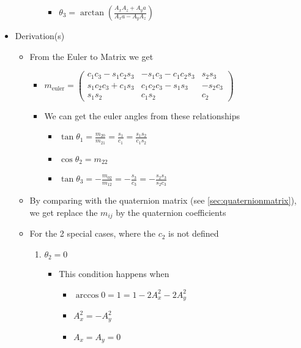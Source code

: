 \documentclass[letterpaper]{article}
\begin{document}
\begin{itemize}
\begin{itemize}
\begin{enumerate}
\begin{itemize}
								\item $\theta_3 = \arctan{\left(\frac{A_xA_z + A_ya}{A_xa - A_yA_z}\right)}$
							\end{itemize}
					\end{enumerate}
			\end{itemize}
		\item Derivation(s)
			\begin{itemize}
				\item From the Euler to Matrix we get
					\begin{itemize}
						\item $m_\text{euler} = \left(\begin{array}{ccc}
																						c_1c_3 - s_1c_2s_3 			& -s_1c_3 - c_1c_2s_3 			& s_2s_3			\\
																						s_1c_2c_3 + c_1s_3 			& c_1c_2c_3 - s_1s_3				& -s_2c_3			\\
																						s_1s_2									& c_1s_2										& c_2					
																					\end{array} \right)$
						\item We can get the euler angles from these relationships
							\begin{itemize}
								\item $\tan\theta_1 = \frac{m_{20}}{m_{21}} = \frac{s_1}{c_1} = \frac{s_1s_2}{c_1s_2}$
								\item $\cos\theta_2 = m_{22}$
								\item $\tan\theta_3 = -\frac{m_{02}}{m_{12}} = -\frac{s_3}{c_3} = -\frac{s_2s_3}{s_2c_3}$
							\end{itemize}
					\end{itemize}
				\item By comparing with the quaternion matrix (see \ref{sec:quaternionmatrix}), we get replace the $m_{ij}$ by the quaternion coefficients
				\item For the 2 special cases, where the $c_2$ is not defined
					\begin{enumerate}
						\item $\theta_2 = 0$
							\begin{itemize}
								\item This condition happens when
									\begin{itemize}
										\item $\arccos{0} = 1 = 1 - 2A_x^2 - 2A_y^2$
										\item $A_x^2 = - A_y^2$
										\item $A_x = A_y = 0$

\end{itemize}
\end{itemize}
\end{enumerate}
\end{itemize}
\end{itemize}
\end{document}
